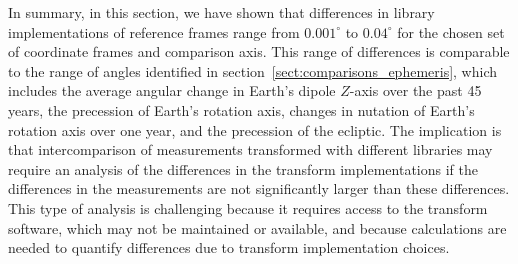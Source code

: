 \documentclass[draft]{agujournal2019}
\begin{document}
In summary, in this section, we have shown that differences in library implementations of reference frames range from $0.001^\circ$ to $0.04^\circ$ for the chosen set of coordinate frames and comparison axis.
This range of differences is comparable to the range of angles identified in section~\ref{sect:comparisons_ephemeris}, which includes the average angular change in Earth's dipole $Z$-axis over the past 45 years, the precession of Earth's rotation axis, changes in nutation of Earth's rotation axis over one year, and the precession of the ecliptic. The implication is that intercomparison of measurements transformed with different libraries may require an analysis of the differences in the transform implementations if the differences in the measurements are not significantly larger than these differences. This type of analysis is challenging because it requires access to the transform software, which may not be maintained or available, and because calculations are needed to quantify differences due to transform implementation choices.
\end{document}
